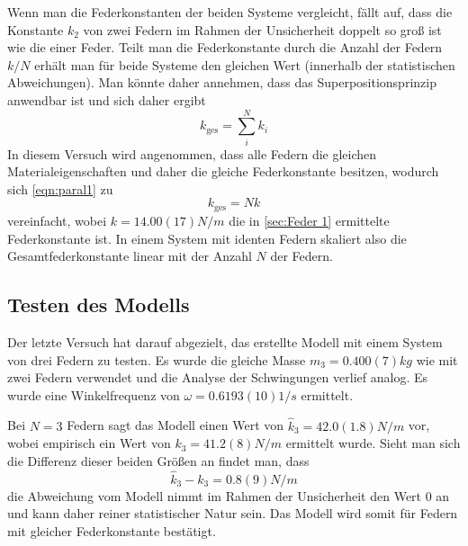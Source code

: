Wenn man die Federkonstanten der beiden Systeme vergleicht, fällt auf, dass die Konstante \( k_2 \) von zwei Federn im Rahmen der Unsicherheit doppelt so groß ist wie die einer Feder. Teilt man die Federkonstante durch die Anzahl der Federn \( k/N \) erhält man für beide Systeme den gleichen Wert (innerhalb der statistischen Abweichungen). Man könnte daher annehmen, dass das Superpositionsprinzip anwendbar ist und sich daher ergibt
\begin{equation}\label{eqn:paral1}
	k_{\text{ges}} = \sum_{i}^{N} k_i
\end{equation}
In diesem Versuch wird angenommen, dass alle Federn die gleichen Materialeigenschaften und daher die gleiche Federkonstante besitzen, wodurch sich \autoref{eqn:paral1} zu
\begin{equation}\label{eqn:paral2}
	k_{\text{ges}} = Nk
\end{equation}
vereinfacht, wobei \( k = 14.00(17) \unit{N/m} \) die in \autoref{sec:Feder 1} ermittelte Federkonstante ist. In einem System mit identen Federn skaliert also die Gesamtfederkonstante linear mit der Anzahl \( N \) der Federn.

\subsection{Testen des Modells}
Der letzte Versuch hat darauf abgezielt, das erstellte Modell mit einem System von drei Federn zu testen. Es wurde die gleiche Masse \( m_3 = 0.400(7) \unit{kg} \) wie mit zwei Federn verwendet und die Analyse der Schwingungen verlief analog. Es wurde eine Winkelfrequenz von \( \omega = 0.6193(10) \unit{1/s} \) ermittelt.

Bei \( N = 3 \) Federn sagt das Modell einen Wert von \( \hat{k}_3 = 42.0(1.8) \unit{N/m} \) vor, wobei empirisch ein Wert von \( k_3 = 41.2(8) \unit{N/m} \) ermittelt wurde. Sieht man sich die Differenz dieser beiden Größen an findet man, dass
\begin{equation}\label{eqn:diff}
	\hat{k}_3 - k_3 = 0.8(9) \unit{N/m}
\end{equation}
die Abweichung vom Modell nimmt im Rahmen der Unsicherheit den Wert 0 an und kann daher reiner statistischer Natur sein. Das Modell wird somit für Federn mit gleicher Federkonstante bestätigt.







